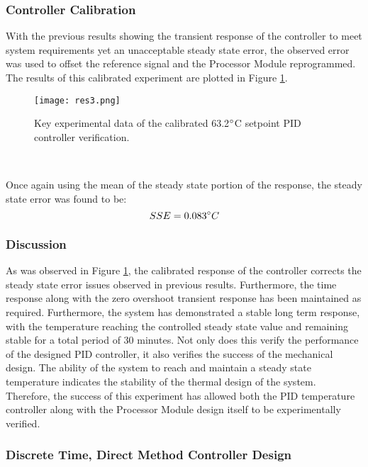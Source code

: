 
\subsubsection{Controller Calibration}

With the previous results showing the transient response of the controller to meet system requirements yet an unacceptable steady state error, the observed error was used to offset the reference signal and the Processor Module reprogrammed. The results of this calibrated experiment are plotted in Figure \ref{fig:res3}. 

\begin{figure}[!htb]
	\centering
	\texttt{[image: res3.png]}
	\caption[Temperature Sensor Data Key Values - calibrated 63.2$\degree$C Setpoint.]{Key experimental data of the calibrated 63.2$\degree$C setpoint PID controller verification.}
	\label{fig:res3}
\end{figure} 
\FloatBarrier

Once again using the mean of the steady state portion of the response, the steady state error was found to be: 
$$ SSE = 0.083\degree C$$

\subsubsection{Discussion}

As was observed in Figure \ref{fig:res3}, the calibrated response of the controller corrects the steady state error issues observed in previous results. Furthermore, the time response along with the zero overshoot transient response has been maintained as required. Furthermore, the system has demonstrated a stable long term response, with the temperature reaching the controlled steady state value and remaining stable for a total period of 30 minutes. Not only does this verify the performance of the designed PID controller, it also verifies the success of the mechanical design. The ability of the system to reach and maintain a steady state temperature indicates the stability of the thermal design of the system. Therefore, the success of this experiment has allowed both the PID temperature controller along with the Processor Module design itself to be experimentally verified.

\subsubsection{Discrete Time, Direct Method Controller Design}

